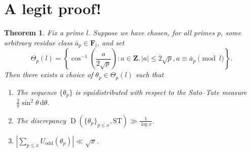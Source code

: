 \documentclass{article}
\DeclareMathOperator{\disc}{D}
\newcommand{\bF}{\mathbf{F}}
\newcommand{\bZ}{\mathbf{Z}}
\newcommand{\dd}{\mathrm{d}}
\newcommand{\ST}{\mathrm{ST}}
\newtheorem{theorem}[subsection]{Theorem}
\begin{document}
\section{A legit proof!}

\begin{theorem}
Fix a prime $l$. Suppose we have chosen, for all primes $p$, some arbitrary 
residue class $\bar a_p\in \bF_l$, and set 
\[
	\Theta_p(l) = \left\{\cos^{-1}\left(\frac{a}{2\sqrt p}\right) : a\in \bZ, |a|\leqslant 2\sqrt p, a \equiv \bar a_p\pmod l\right\} .
\]
Then there exists a choice of $\theta_p\in \Theta_p(l)$ such that 
\begin{enumerate}
\item
The sequence $\{\theta_p\}$ is equidistributed with respect to the Sato--Tate 
measure $\frac{2}{\pi}\sin^2\theta\, \dd \theta$. 

\item
The discrepancy $\disc(\{\theta_p\}_{p\leqslant x}, \ST) \gg \frac{1}{\log x}$. 

\item
$\left| \sum_{p\leqslant x} U_\mathrm{odd}(\theta_p)\right| \ll \sqrt x$. 
\end{enumerate}
\end{theorem}
\end{document}
